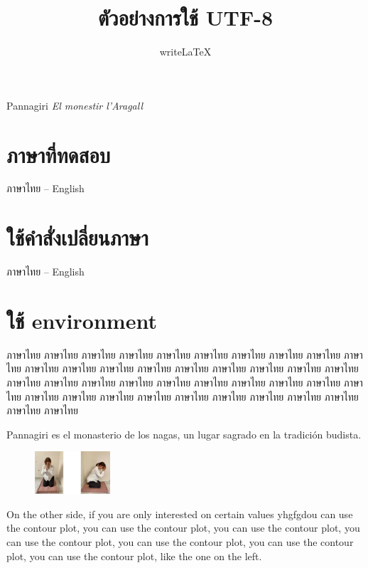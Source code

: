 \documentclass{article}
\begin{document}
\title{ตัวอย่างการใช้ UTF-8}
\author{writeLaTeX}
\begin{titlepage}
    \centering
    \vspace*{2cm}
    \Huge
    Pannagiri
    \emph{El monestir l'Aragall}
    \vfill
    \Large
    \vspace{0.8cm}
\end{titlepage}
\maketitle
\section{ภาษาที่ทดสอบ}

ภาษาไทย -- \foreignlanguage{english}{English}

\section{ใช้คำสั่งเปลี่ยนภาษา}

ภาษาไทย --  English 

\section{ใช้ environment}

ภาษาไทย ภาษาไทย ภาษาไทย ภาษาไทย ภาษาไทย ภาษาไทย ภาษาไทย ภาษาไทย ภาษาไทย ภาษาไทย 
ภาษาไทย ภาษาไทย ภาษาไทย ภาษาไทย ภาษาไทย ภาษาไทย ภาษาไทย ภาษาไทย ภาษาไทย ภาษาไทย 
ภาษาไทย ภาษาไทย ภาษาไทย ภาษาไทย ภาษาไทย ภาษาไทย ภาษาไทย ภาษาไทย ภาษาไทย ภาษาไทย 
ภาษาไทย ภาษาไทย ภาษาไทย ภาษาไทย ภาษาไทย ภาษาไทย ภาษาไทย ภาษาไทย ภาษาไทย ภาษาไทย 

Pannagiri es el monasterio de los nagas, un lugar sagrado en la tradición budista.
\begin{figure} %
    \centering
    \includegraphics[width=0.25\textwidth]{vandami_woman.jpg}
\end{figure}
On the other side, if you are only interested on
certain values yhgfgdou can use the contour plot, you 
can use the contour plot, you can use the contour 
plot, you can use the contour plot, you can use 
the contour plot, you can use the contour plot, 
you can use the contour plot, like the one on the left.
\end{document}
